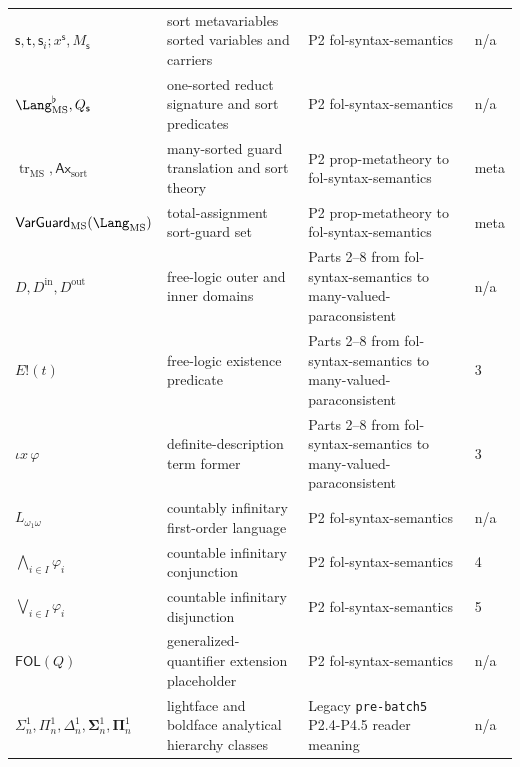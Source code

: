 \begin{longtable}{@{}p{}p{}p{}p{}@{}}
\(\mathsf s,\allowbreak \mathsf t,\allowbreak \mathsf s_i;\allowbreak x^{\mathsf s},\allowbreak M_{\mathsf s}\) & sort metavariables sorted variables and carriers & P2 fol-\allowbreak{}syntax-\allowbreak{}semantics & n/a \\
\(\Lang_{\mathrm{MS}}^{\flat},\allowbreak Q_{\mathsf s}\) & one-sorted reduct signature and sort predicates & P2 fol-\allowbreak{}syntax-\allowbreak{}semantics & n/a \\
\(\operatorname{tr}_{\mathrm{MS}},\allowbreak \mathsf{Ax}_{\mathrm{sort}}\) & many-sorted guard translation and sort theory & P2 prop-\allowbreak{}metatheory to fol-\allowbreak{}syntax-\allowbreak{}semantics & meta \\
\(\mathsf{VarGuard}_{\mathrm{MS}}(\Lang_{\mathrm{MS}})\) & total-assignment sort-guard set & P2 prop-\allowbreak{}metatheory to fol-\allowbreak{}syntax-\allowbreak{}semantics & meta \\
\(D,\allowbreak D^{\mathrm{in}},\allowbreak D^{\mathrm{out}}\) & free-logic outer and inner domains & Parts 2--8 from fol-\allowbreak{}syntax-\allowbreak{}semantics to many-\allowbreak{}valued-\allowbreak{}paraconsistent & n/a \\
\(E!(t)\) & free-logic existence predicate & Parts 2--8 from fol-\allowbreak{}syntax-\allowbreak{}semantics to many-\allowbreak{}valued-\allowbreak{}paraconsistent & 3 \\
\(\iota x\,\varphi\) & definite-description term former & Parts 2--8 from fol-\allowbreak{}syntax-\allowbreak{}semantics to many-\allowbreak{}valued-\allowbreak{}paraconsistent & 3 \\
\(L_{\omega_1\omega}\) & countably infinitary first-order language & P2 fol-\allowbreak{}syntax-\allowbreak{}semantics & n/a \\
\(\bigwedge_{i\in I}\varphi_i\) & countable infinitary conjunction & P2 fol-\allowbreak{}syntax-\allowbreak{}semantics & 4 \\
\(\bigvee_{i\in I}\varphi_i\) & countable infinitary disjunction & P2 fol-\allowbreak{}syntax-\allowbreak{}semantics & 5 \\
\(\mathsf{FOL}(Q)\) & generalized-quantifier extension placeholder & P2 fol-\allowbreak{}syntax-\allowbreak{}semantics & n/a \\
\(\Sigma^1_n,\allowbreak \Pi^1_n,\allowbreak \Delta^1_n,\allowbreak \boldsymbol\Sigma^1_n,\allowbreak \boldsymbol\Pi^1_n\) & lightface and boldface analytical hierarchy classes & Legacy \texttt{pre-\allowbreak{}batch5} P2.\allowbreak{}4-\allowbreak{}P4.\allowbreak{}5 reader meaning & n/a \\

\end{longtable}
